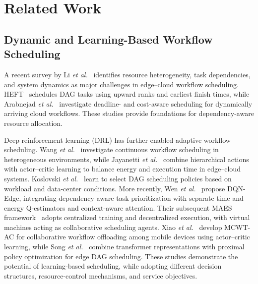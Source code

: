 \documentclass[journal]{IEEEtran}
\begin{document}
\section{Related Work}
\subsection{Dynamic and Learning-Based Workflow Scheduling}
A recent survey by Li \emph{et al.}~\cite{li2026survey} identifies resource heterogeneity, task dependencies, and system dynamics as major challenges in edge--cloud workflow scheduling. HEFT~\cite{topcuoglu2002} schedules DAG tasks using upward ranks and earliest finish times, while Arabnejad \emph{et al.}~\cite{arabnejad2019} investigate deadline- and cost-aware scheduling for dynamically arriving cloud workflows. These studies provide foundations for dependency-aware resource allocation.

Deep reinforcement learning (DRL) has further enabled adaptive workflow scheduling. Wang \emph{et al.}~\cite{wang2025continuous} investigate continuous workflow scheduling in heterogeneous environments, while Jayanetti \emph{et al.}~\cite{jayanetti2022} combine hierarchical actions with actor--critic learning to balance energy and execution time in edge--cloud systems. Koslovski \emph{et al.}~\cite{koslovski2024} learn to select DAG scheduling policies based on workload and data-center conditions. More recently, Wen \emph{et al.}~\cite{wen2026} propose DQN-Edge, integrating dependency-aware task prioritization with separate time and energy Q-estimators and context-aware attention. Their subsequent MAES framework~\cite{wen2026maes} adopts centralized training and decentralized execution, with virtual machines acting as collaborative scheduling agents. Xiao \emph{et al.}~\cite{xiao2025} develop MCWT-AC for collaborative workflow offloading among mobile devices using actor--critic learning, while Song \emph{et al.}~\cite{song2026} combine transformer representations with proximal policy optimization for edge DAG scheduling. These studies demonstrate the potential of learning-based scheduling, while adopting different decision structures, resource-control mechanisms, and service objectives.
\end{document}
